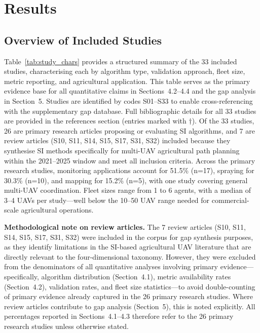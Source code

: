 \documentclass[review,3p,times]{elsarticle}
\begin{document}
\section{Results}

\subsection{Overview of Included Studies}
Table~\ref{tab:study_chars} provides a structured summary of the 33 included studies, characterising each by algorithm type, validation approach, fleet size, metric reporting, and agricultural application. This table serves as the primary evidence base for all quantitative claims in Sections~4.2--4.4 and the gap analysis in Section~5. Studies are identified by codes S01--S33 to enable cross-referencing with the supplementary gap database. Full bibliographic details for all 33 studies are provided in the references section (entries marked with $\dagger$). Of the 33 studies, 26 are primary research articles proposing or evaluating SI algorithms, and 7 are review articles (S10, S11, S14, S15, S17, S31, S32) included because they synthesise SI methods specifically for multi-UAV agricultural path planning within the 2021--2025 window and meet all inclusion criteria. Across the primary research studies, monitoring applications account for 51.5\% (n=17), spraying for 30.3\% (n=10), and mapping for 15.2\% (n=5), with one study covering general multi-UAV coordination. Fleet sizes range from 1 to 6 agents, with a median of 3--4 UAVs per study---well below the 10--50 UAV range needed for commercial-scale agricultural operations.

\textbf{Methodological note on review articles.} The 7 review articles (S10, S11, S14, S15, S17, S31, S32) were included in the corpus for gap synthesis purposes, as they identify limitations in the SI-based agricultural UAV literature that are directly relevant to the four-dimensional taxonomy. However, they were excluded from the denominators of all quantitative analyses involving primary evidence---specifically, algorithm distribution (Section~4.1), metric availability rates (Section~4.2), validation rates, and fleet size statistics---to avoid double-counting of primary evidence already captured in the 26 primary research studies. Where review articles contribute to gap analysis (Section~5), this is noted explicitly. All percentages reported in Sections~4.1--4.3 therefore refer to the 26 primary research studies unless otherwise stated.
\end{document}
